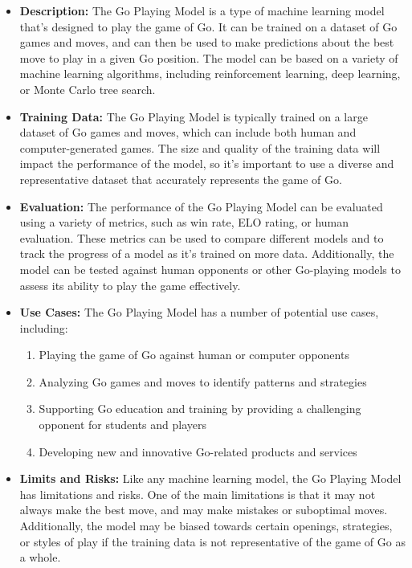 \begin{itemize}
    \item \textbf{Description:} The Go Playing Model is a type of machine learning model that's designed to play the game of Go. It can be trained on a dataset of Go games and moves, and can then be used to make predictions about the best move to play in a given Go position. The model can be based on a variety of machine learning algorithms, including reinforcement learning, deep learning, or Monte Carlo tree search.
    \item \textbf{Training Data:} The Go Playing Model is typically trained on a large dataset of Go games and moves, which can include both human and computer-generated games. The size and quality of the training data will impact the performance of the model, so it's important to use a diverse and representative dataset that accurately represents the game of Go.
    \item \textbf{Evaluation:} The performance of the Go Playing Model can be evaluated using a variety of metrics, such as win rate, ELO rating, or human evaluation. These metrics can be used to compare different models and to track the progress of a model as it's trained on more data. Additionally, the model can be tested against human opponents or other Go-playing models to assess its ability to play the game effectively.
    \item \textbf{Use Cases:} The Go Playing Model has a number of potential use cases, including:
        \begin{enumerate}  
            \item Playing the game of Go against human or computer opponents
            \item Analyzing Go games and moves to identify patterns and strategies
            \item Supporting Go education and training by providing a challenging opponent for students and players
            \item Developing new and innovative Go-related products and services
        \end{enumerate}
    \item \textbf{Limits and Risks:} Like any machine learning model, the Go Playing Model has limitations and risks. One of the main limitations is that it may not always make the best move, and may make mistakes or suboptimal moves. Additionally, the model may be biased towards certain openings, strategies, or styles of play if the training data is not representative of the game of Go as a whole.

\end{itemize}
